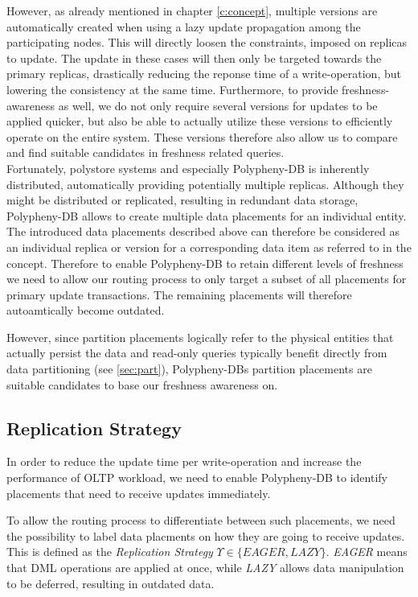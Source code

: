 However, as already mentioned in chapter \ref{c:concept}, multiple versions are automatically created when using a lazy update propagation among the participating nodes. 
This will directly loosen the constraints, imposed on replicas to update. 
The update in these cases will then only be targeted towards the primary replicas, drastically reducing the reponse time of a write-operation,
but lowering the consistency at the same time. 
Furthermore, to provide freshness-awareness as well, we do not only require several versions for updates to be applied quicker,
but also be able to actually utilize these versions to efficiently operate on the entire system.
These versions therefore also allow us to compare and find suitable candidates in freshness related queries.\\

Fortunately, polystore systems and especially Polypheny-DB is inherently distributed, automatically providing potentially multiple replicas.
Although they might be distributed or replicated, resulting in redundant data storage, Polypheny-DB allows to create multiple data placements for an individual entity.
The introduced data placements described above can therefore be considered as an individual replica or version for a corresponding data item as referred to in the concept.
Therefore to enable Polypheny-DB to retain different levels of freshness we need to allow our routing process
to only target a subset of all placements for primary update transactions. The remaining placements will therefore autoamtically become outdated. 

However, since partition placements logically refer to the physical entities that actually persist the data and 
read-only queries typically benefit directly from data partitioning (see \ref{sec:part}), Polypheny-DBs partition placements 
are suitable candidates to base our freshness awareness on.





\subsection{Replication Strategy}
\label{sec:strategy}

In order to reduce the update time per write-operation and increase the performance
of OLTP workload, we need to enable Polypheny-DB to identify placements that need to receive updates immediately. 

To allow the routing process to differentiate between such placements,
we need the possibility to label data placments on how they are going to receive updates. This is defined as the \emph{Replication Strategy} $\Upsilon \in \{EAGER,LAZY\}$.
\emph{EAGER} means that DML operations are applied at once, while \emph{LAZY}
allows data manipulation to be deferred, resulting in outdated data.\\


